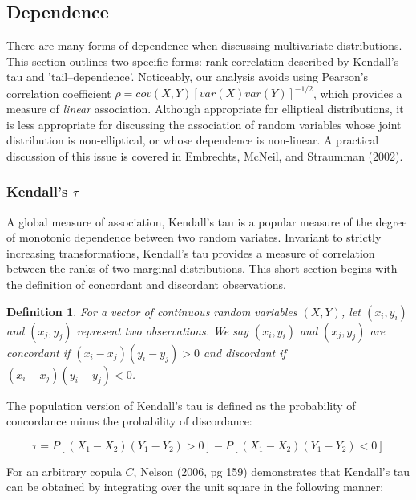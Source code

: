 \documentclass[12pt]{article}
\newtheorem{defn}{Definition}
\begin{document}
\subsection{Dependence}

There are many forms of dependence when discussing multivariate
distributions. This section outlines two specific forms: rank correlation
described by Kendall's tau and 'tail--dependence'. Noticeably, our analysis
avoids using Pearson's correlation coefficient
$\rho = cov\left(X,Y\right)\left[var\left(X\right)var\left(Y\right)\right]^{-1/2}$,
which provides a measure of \textit{linear} association. Although
appropriate for elliptical distributions, it is less appropriate for
discussing the association of random variables whose joint distribution
is non-elliptical, or whose dependence is non-linear. A practical
discussion of this issue is covered in Embrechts, McNeil, and Straumman
(2002).

\subsubsection{Kendall's $\tau$}

A global measure of association, Kendall's tau is a popular measure of
the degree of monotonic dependence between two random variates. Invariant
to strictly increasing transformations, Kendall's tau provides a measure
of correlation between the ranks of two marginal distributions. This short
section begins with the definition of concordant and discordant
observations.

\begin{defn}
For a vector of continuous random variables $\left(X,Y\right)$, let
$\left(x_{i},y_{i}\right)$ and $\left(x_{j},y_{j}\right)$ represent two
observations. We say $\left(x_{i},y_{i}\right)$ and
$\left(x_{j},y_{j}\right)$ are concordant if
$\left(x_{i} - x_{j}\right)\left(y_{i}-y_{j}\right) > 0$ and discordant
if $\left(x_{i}-x_{j}\right)\left(y_{i} - y_{j}\right) < 0$.
\end{defn}

The population version of Kendall's tau is defined as the probability of
concordance minus the probability of discordance:

\begin{equation}
\tau = P\left[\left(X_{1} - X_{2}\right)\left(Y_{1} - Y_{2}\right) > 0\right] - P\left[\left(X_{1} - X_{2}\right)\left(Y_{1} - Y_{2}\right) < 0\right]
\end{equation}

For an arbitrary copula $C$, Nelson (2006, pg 159) demonstrates that
Kendall's tau can be obtained by integrating over the unit square in the
following manner:
\end{document}
